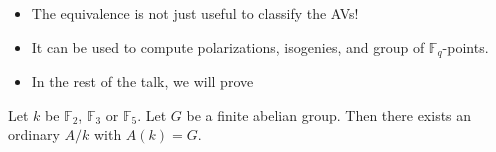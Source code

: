 \documentclass[usenames,dvipsnames,handout]{beamer}
\def\Z{\mathbb{Z}}
\def\F{\mathbb{F}}
\DeclareMathOperator{\Aut}{Aut}
\DeclareMathOperator{\End}{End}
\begin{document}


\begin{frame}{ }
    \begin{itemize}
    \item The equivalence is not just useful to classify the AVs!
    \pause
    \item It can be used to compute polarizations, isogenies, and group of $\F_q$-points.
    \pause
    \item In the rest of the talk, we will prove
    \end{itemize}
    \begin{theorem}[M.-Springer]
        Let $k$ be $\F_2$, $\F_3$ or $\F_5$. Let $G$ be a finite abelian group.
        \pause
        Then there exists an ordinary $A/k$ with $A(k) = G$.
    \end{theorem}
\end{frame}
\end{document}
